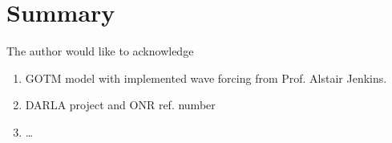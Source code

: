 \documentclass[final]{svjour3}
\begin{document}
\section{Summary}
\label{sec:summary}


\begin{acknowledgements}
The author would like to acknowledge
\begin{enumerate}
  \item GOTM model with implemented wave
forcing from Prof. Alstair Jenkins.
  \item DARLA project and ONR ref. number
  \item \ldots 
\end{enumerate}

\end{acknowledgements}




\end{document}
